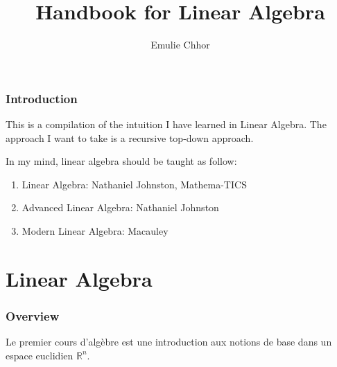 \documentclass{article}
\begin{document}
\title{Handbook for Linear Algebra}
\author{Emulie Chhor}
\maketitle

\section*{Introduction}

This is a compilation of the intuition I have learned in Linear Algebra.
The approach I want to take is a recursive top-down approach.

In my mind, linear algebra should be taught as follow:
\begin{enumerate}
    \item Linear Algebra: Nathaniel Johnston, Mathema-TICS
    \item Advanced Linear Algebra: Nathaniel Johnston
    \item Modern Linear Algebra: Macauley
\end{enumerate}

\newtheorem{definition}{Definition}[subsection]
\newtheorem{theorem}{Theorem}[subsection]
\newtheorem{corollary}{Corollary}[subsection]
\newtheorem{lemma}[theorem]{Lemma}
\newtheorem{proposition}{Proposition}[section]
\newtheorem{axiom}{Axiome}
\newtheorem{property}{Propriété}[subsection]
\newtheorem*{remark}{Remarque}
\newtheorem*{proof}{Proof}[subsection]
\newtheorem*{problem}{Problème}
\newtheorem*{intuition}{Intuition}

\part{Linear Algebra} %
\label{prt:Linear Algebra}


\section{Overview}%
\label{sec:Overview}

Le premier cours d'algèbre est une introduction aux notions de base
dans un espace euclidien $\mathbb{R}^n$.
\end{document}
